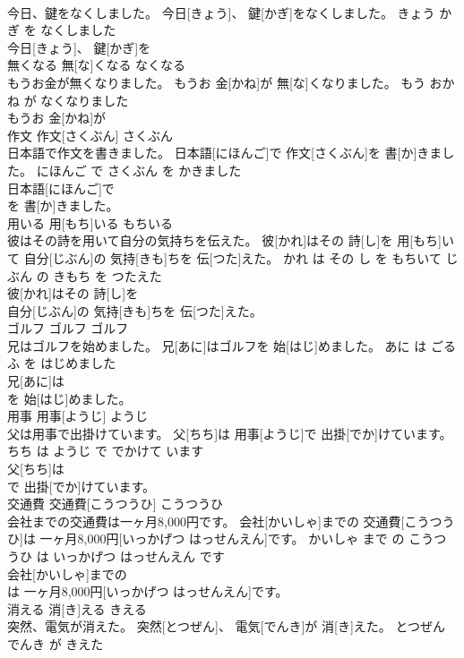 \documentclass[8pt]{extreport}
\begin{document}
\begin{CJK}{UTF8}{min}
\\	今日、鍵をなくしました。	今日[きょう]、 鍵[かぎ]をなくしました。	きょう かぎ を なくしました	
\\	今日[きょう]、 鍵[かぎ]を
\\	無くなる	無[な]くなる	なくなる	
\\	もうお金が無くなりました。	もうお 金[かね]が 無[な]くなりました。	もう おかね が なくなりました	
\\	もうお 金[かね]が
\\	作文	作文[さくぶん]	さくぶん	
\\	日本語で作文を書きました。	日本語[にほんご]で 作文[さくぶん]を 書[か]きました。	にほんご で さくぶん を かきました	
\\	日本語[にほんご]で
\\	を 書[か]きました。		
\\	用いる	用[もち]いる	もちいる	
\\	彼はその詩を用いて自分の気持ちを伝えた。	彼[かれ]はその 詩[し]を 用[もち]いて 自分[じぶん]の 気持[きも]ちを 伝[つた]えた。	かれ は その し を もちいて じぶん の きもち を つたえた	
\\	彼[かれ]はその 詩[し]を
\\	自分[じぶん]の 気持[きも]ちを 伝[つた]えた。		
\\	ゴルフ	ゴルフ	ゴルフ	
\\	兄はゴルフを始めました。	兄[あに]はゴルフを 始[はじ]めました。	あに は ごるふ を はじめました	
\\	兄[あに]は
\\	を 始[はじ]めました。		
\\	用事	用事[ようじ]	ようじ	
\\	父は用事で出掛けています。	父[ちち]は 用事[ようじ]で 出掛[でか]けています。	ちち は ようじ で でかけて います	
\\	父[ちち]は
\\	で 出掛[でか]けています。		
\\	交通費	交通費[こうつうひ]	こうつうひ	
\\	会社までの交通費は一ヶ月8,000円です。	会社[かいしゃ]までの 交通費[こうつうひ]は 一ヶ月8,000円[いっかげつ はっせんえん]です。	かいしゃ まで の こうつうひ は いっかげつ はっせんえん です	
\\	会社[かいしゃ]までの
\\	は 一ヶ月8,000円[いっかげつ はっせんえん]です。		
\\	消える	消[き]える	きえる	
\\	突然、電気が消えた。	突然[とつぜん]、 電気[でんき]が 消[き]えた。	とつぜん でんき が きえた	

\end{CJK}
\end{document}
